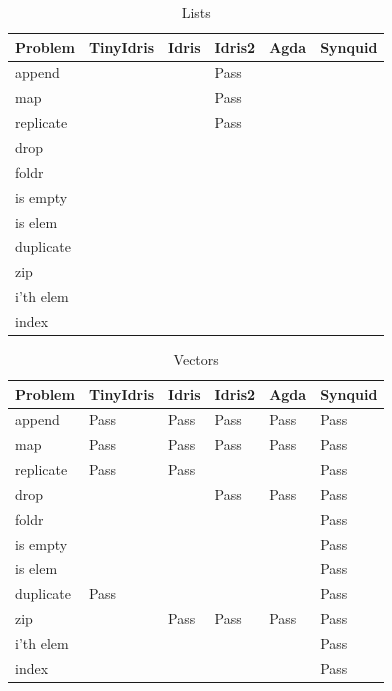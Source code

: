 \documentclass[a4paper]{article}
\begin{document}
\begin{table}[!htb]
\begin{center}
\begin{tabular}{|l|l|l|l|l|l|}
\hline
Problem & TinyIdris & Idris & Idris2 & Agda & Synquid \\
\hline
append &   &   & Pass &  &  \\
map &   &   & Pass &  & \\
replicate &   &   & Pass &  & \\
drop &   &   &   &  &   \\
foldr &   &   &   & &  \\
is empty &   &   &   &  & \\
is elem &   &   &   & &  \\
duplicate &   &   &   & &  \\
zip &   &   &   & & \\
i'th elem &   &   &   & & \\
index &   &   &   & & \\
\hline
\end{tabular}
\caption{Lists}
\end{center}
\end{table}


\begin{table}[!htb]
  \begin{center}
\begin{tabular}{|l|l|l|l|l|l|}
\hline
Problem & TinyIdris & Idris & Idris2 & Agda & Synquid \\
\hline
append & Pass & Pass & Pass & Pass & Pass\\
map & Pass  & Pass & Pass & Pass & Pass\\
replicate & Pass & Pass & &   & Pass\\
drop &   &   & Pass & Pass  & Pass\\
foldr &   &   &   &   & Pass\\
is empty &   &   &   &   & Pass\\
is elem &   &   &   &   & Pass\\
duplicate & Pass &   &   &   & Pass\\
zip &   & Pass & Pass & Pass  & Pass\\
i'th elem &   &   &   &   & Pass\\
index &   &   &   &   & Pass\\
\hline
\end{tabular}
\caption{Vectors}
\end{center}
\end{table}
\end{document}
